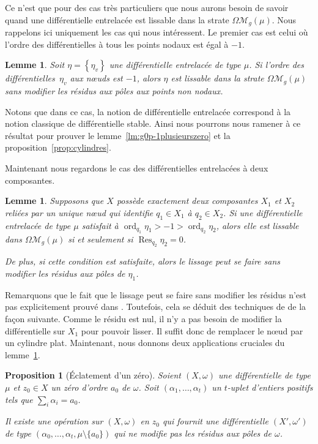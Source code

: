 \documentclass[11pt]{article}
\numberwithin{equation}{section}\renewcommand{\proofname}{Démonstration}
\let\mathcal\mathscr
\DeclareMathOperator{\ord}{ord}
\newcommand\Res{\operatorname{Res}}
\newcommand{\omoduli}[1][g]{{\Omega\mathcal M}_{\!#1}}
\newtheorem{prop}[thm]{Proposition}
\newtheorem{lem}[thm]{Lemme}
\theoremstyle{definition}
\begin{document}
Ce n'est que pour des cas très particuliers que nous aurons besoin de savoir quand une différentielle entrelacée est lissable dans la strate $\omoduli(\mu)$. Nous rappelons ici uniquement les cas qui nous intéressent. Le premier cas est celui où l'ordre des différentielles à tous les points nodaux est égal à $-1$.
\begin{lem}\label{lem:lisspolessimples}
Soit $\eta=\left\{\eta_{v}\right\}$ une différentielle entrelacée de type $\mu$. Si l'ordre des différentielles~$\eta_v$ aux nœuds est $-1$, alors $\eta$ est lissable dans la strate $\omoduli(\mu)$ sans modifier les résidus aux pôles aux points non nodaux.
\end{lem}
Notons que dans ce cas, la notion de différentielle entrelacée correspond à la notion classique de différentielle stable. Ainsi nous pourrons nous ramener à ce résultat pour prouver le lemme~\ref{lm:g0p-1plusieurszero} et la proposition~\ref{prop:cylindres}.

Maintenant nous regardons le cas des différentielles entrelacées à deux composantes.
\begin{lem}\label{lem:lissdeuxcomp}
Supposons que $X$ possède exactement deux composantes $X_{1}$ et $X_{2}$ reliées par un unique nœud qui identifie $q_1 \in X_{1}$ à $q_2 \in X_{2}$. Si une différentielle entrelacée de type $\mu$ satisfait à $\ord_{q_1} \eta_{1}>-1>\ord_{q_2} \eta_{2}$, alors elle est lissable dans $\omoduli(\mu)$ si et seulement si $\Res_{q_2}\eta_{2}=0$.

De plus, si cette condition est satisfaite, alors le lissage peut se faire sans modifier les résidus aux pôles de $\eta_{1}$.
\end{lem}
Remarquons que le fait que le lissage peut se faire sans modifier les résidus n'est pas explicitement prouvé dans \cite{BCGGM}. Toutefois, cela se déduit des techniques de \cite{BCGGM} de la façon suivante. Comme le résidu est nul, il n'y a pas besoin de modifier la différentielle sur $X_{1}$ pour pouvoir lisser. Il suffit donc de remplacer le nœud par un cylindre plat.
Maintenant, nous donnons deux applications cruciales du lemme~\ref{lem:lissdeuxcomp}.
\begin{prop}[Éclatement d'un zéro]\label{prop:eclatZero}
Soient $(X,\omega)$ une différentielle de type $\mu$ et $z_{0}\in X$ un zéro d'ordre $a_{0}$ de $\omega$. Soit $(\alpha_{1},\dots,\alpha_{t})$ un $t$-uplet d'entiers positifs tels que $\sum_{i}\alpha_{i}=a_{0}$.

Il existe une opération sur $(X,\omega)$ en $z_{0}$ qui fournit une différentielle $(X',\omega')$ de type $(\alpha_{0},\dots,\alpha_{t},\mu\setminus\lbrace a_{0}\rbrace)$ qui ne modifie pas les résidus aux pôles de $\omega$.
\end{prop}
\end{document}
